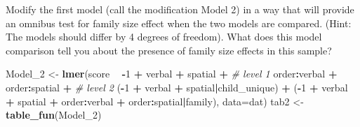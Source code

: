 \documentclass[]{article}
\newenvironment{Shaded}{\begin{snugshade}}{\end{snugshade}}
\newcommand{\KeywordTok}[1]{\textcolor[rgb]{0.13,0.29,0.53}{\textbf{#1}}}
\newcommand{\DataTypeTok}[1]{\textcolor[rgb]{0.13,0.29,0.53}{#1}}
\newcommand{\DecValTok}[1]{\textcolor[rgb]{0.00,0.00,0.81}{#1}}
\newcommand{\StringTok}[1]{\textcolor[rgb]{0.31,0.60,0.02}{#1}}
\newcommand{\CommentTok}[1]{\textcolor[rgb]{0.56,0.35,0.01}{\textit{#1}}}
\newcommand{\OperatorTok}[1]{\textcolor[rgb]{0.81,0.36,0.00}{\textbf{#1}}}
\newcommand{\NormalTok}[1]{#1}
\begin{document}
Modify the first model (call the modification Model 2) in a way that
will provide an omnibus test for family size effect when the two models
are compared. (Hint: The models should differ by 4 degrees of freedom).
What does this model comparison tell you about the presence of family
size effects in this sample?

\begin{Shaded}
\begin{Highlighting}[]
\NormalTok{Model_}\DecValTok{2}\NormalTok{ <-}\StringTok{ }\KeywordTok{lmer}\NormalTok{(score }\OperatorTok{~}\StringTok{ }
\StringTok{                }\OperatorTok{-}\DecValTok{1} \OperatorTok{+}\StringTok{ }\NormalTok{verbal }\OperatorTok{+}\StringTok{ }\NormalTok{spatial }\OperatorTok{+}\StringTok{         }\CommentTok{# level 1}
\StringTok{                }\NormalTok{order}\OperatorTok{:}\NormalTok{verbal }\OperatorTok{+}\StringTok{ }\NormalTok{order}\OperatorTok{:}\NormalTok{spatial }\OperatorTok{+}\StringTok{  }\CommentTok{# level 2}
\StringTok{                }\NormalTok{(}\OperatorTok{-}\DecValTok{1} \OperatorTok{+}\StringTok{ }\NormalTok{verbal }\OperatorTok{+}\StringTok{ }\NormalTok{spatial}\OperatorTok{|}\NormalTok{child_unique) }\OperatorTok{+}
\StringTok{                }\NormalTok{(}\OperatorTok{-}\DecValTok{1} \OperatorTok{+}\StringTok{ }\NormalTok{verbal }\OperatorTok{+}\StringTok{ }\NormalTok{spatial }\OperatorTok{+}\StringTok{ }\NormalTok{order}\OperatorTok{:}\NormalTok{verbal }\OperatorTok{+}\StringTok{ }\NormalTok{order}\OperatorTok{:}\NormalTok{spatial}\OperatorTok{|}\NormalTok{family),}
                \DataTypeTok{data=}\NormalTok{dat) }
\NormalTok{tab2    <-}\StringTok{ }\KeywordTok{table_fun}\NormalTok{(Model_}\DecValTok{2}\NormalTok{)}


\end{Highlighting}
\end{Shaded}
\end{document}
